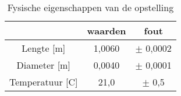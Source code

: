 \begin{table}[h]
    \centering
    \caption{Fysische eigenschappen van de opstelling}
    \begin{tabular}{| c | c | c |}
        \hline
                        & waarden   & fout       \\ \hline
        Lengte [m]      & 1,0060    & $\pm$ 0,0002 \\ \hline
        Diameter [m]    & 0,0040    & $\pm$ 0,0001 \\ \hline
        Temperatuur [C] & 21,0      & $\pm$ 0,5    \\ \hline
        
    \end{tabular}
\end{table}


